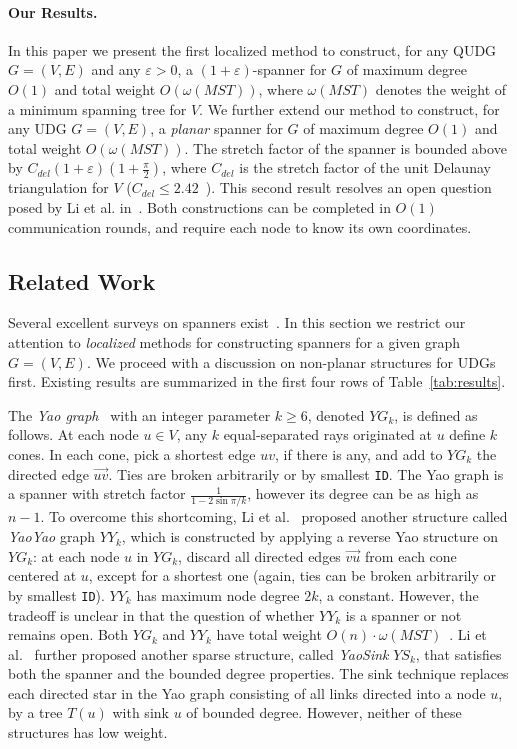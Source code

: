 \documentclass{llncs}
\newcommand{\e}{\varepsilon}
\newcommand{\id}{{\tt ID}}
\newcommand{\w}{\omega}
\begin{document}
\paragraph{Our Results.}
In this paper we present the first localized method to construct, for any QUDG
$G = (V, E)$ and any $\e > 0$,
a $(1+\e)$-spanner for $G$ of maximum degree $O(1)$ and total weight $O(\w(MST))$, where
$\w(MST)$ denotes the weight of a minimum spanning tree for $V$. We further extend
our method to construct, for any UDG $G = (V, E)$,  a \emph{planar} spanner for $G$ of
maximum degree $O(1)$ and
total weight $O(\w(MST))$. The stretch factor of the spanner is bounded above by
$C_{del}(1+\e)(1+\frac{\pi}{2})$, where $C_{del}$ is the stretch factor of the
unit Delaunay triangulation for $V$ ($C_{del} \le 2.42$~\cite{LCW02}).
This second result resolves an open question
posed by Li et al. in~\cite{lws-ieee-04}.
Both constructions can be completed in $O(1)$ communication rounds,
and require each node to know its own coordinates.

\subsection{Related Work}
Several excellent surveys on spanners exist~\cite{Smid00,RajSurvey02,GK06,ns-gsn-07}.
In this section we restrict our attention to \emph{localized} methods for
constructing spanners for a given graph $G=(V,E)$. We proceed with a discussion
on non-planar structures for UDGs first. Existing results are summarized
in the first four rows of Table~\ref{tab:results}.


The \emph{Yao graph}~\cite{Yao82} with an integer parameter $k \ge 6$, denoted $YG_k$,
is defined as follows. At each node
$u \in V$, any $k$ equal-separated rays originated at $u$ define $k$ cones.
In each cone, pick a shortest edge $uv$, if there is any, and add to $YG_k$
the directed edge $\overrightarrow{uv}$. Ties are broken arbitrarily or by
smallest \id. The Yao graph is a spanner with stretch factor
$\frac{1}{1 - 2 \sin{\pi/k}}$, however its degree can be as high as $n-1$.
To overcome this shortcoming, Li et al.~\cite{li02sparse} proposed another
structure called \emph{YaoYao} graph $YY_k$, which is constructed by applying
a reverse Yao structure on $YG_k$: at each node $u$ in $YG_k$, discard all
directed edges $\overrightarrow{vu}$ from each cone centered at $u$, except for
a shortest one (again, ties can be broken arbitrarily or by smallest \id).
$YY_k$ has maximum node degree $2k$,
a constant. However, the tradeoff is unclear in that the question of
whether $YY_k$ is a spanner or not remains open. Both $YG_k$ and $YY_k$
have total weight $O(n)\cdot\w(MST)$~\cite{d-yys-08}.
Li et al.~\cite{WangLi03} further proposed another sparse structure,
called \emph{YaoSink} $YS_k$, that satisfies both the spanner and the
bounded degree properties. The sink technique replaces each directed star
in the Yao graph consisting of all links directed into
a node $u$, by a tree $T(u)$ with sink $u$ of bounded degree.
However, neither of these structures has low weight.
\end{document}

